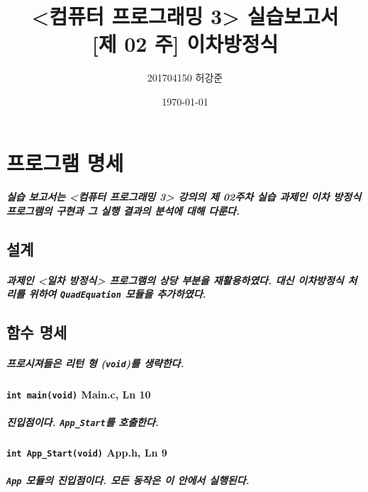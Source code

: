 \documentclass{article}
\begin{document}
    \title{<컴퓨터 프로그래밍 3> 실습보고서 \\ \large [제 02 주] 이차방정식}
    \date{\today}
    \author{201704150 허강준}

    \maketitle

    \newpage

    \tableofcontents

    \newpage

    \section{프로그램 명세}

    \subparagraph{ 실습 보고서는 <컴퓨터 프로그래밍 3> 강의의 제 02주차 실습 과제인 이차 방정식 프로그램의 구현과 그 실행 결과의 분석에 대해 다룬다.}

    \subsection{설계}

    \subparagraph{ 과제인 <일차 방정식> 프로그램의 상당 부분을 재활용하였다. 대신 이차방정식 처리를 위하여 \texttt{QuadEquation} 모듈을 추가하였다.}

    \subsection{함수 명세}

    \subparagraph{ 프로시져들은 리턴 형 (\texttt{void})를 생략한다.}

    \paragraph{\large\texttt{int main(void)} \tiny Main.c, Ln 10}

    \subparagraph{ 진입점이다. \texttt{App\_Start}를 호출한다.}

    \paragraph{\large\texttt{int App\_Start(void)} \tiny App.h, Ln 9}

    \subparagraph{\normalfont\texttt{App} 모듈의 진입점이다. 모든 동작은 이 안에서 실행된다.}
    
\end{document}
